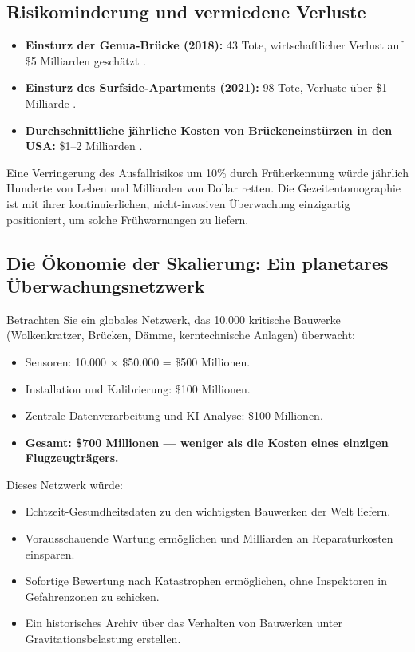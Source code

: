 \documentclass[12pt,a4paper]{article}
\theoremstyle{remark}
\begin{document}
	\subsection{Risikominderung und vermiedene Verluste}
	
	\begin{itemize}
		\item \textbf{Einsturz der Genua-Brücke (2018):} 43 Tote, wirtschaftlicher Verlust auf \$5 Milliarden geschätzt \cite{Genoa2018}.
		\item \textbf{Einsturz des Surfside-Apartments (2021):} 98 Tote, Verluste über \$1 Milliarde \cite{Surfside2021}.
		\item \textbf{Durchschnittliche jährliche Kosten von Brückeneinstürzen in den USA:} \$1–2 Milliarden \cite{ASCE2021}.
	\end{itemize}
	
	Eine Verringerung des Ausfallrisikos um 10\% durch Früherkennung würde jährlich Hunderte von Leben und Milliarden von Dollar retten. Die Gezeitentomographie ist mit ihrer kontinuierlichen, nicht-invasiven Überwachung einzigartig positioniert, um solche Frühwarnungen zu liefern.
	
	\subsection{Die Ökonomie der Skalierung: Ein planetares Überwachungsnetzwerk}
	
	Betrachten Sie ein globales Netzwerk, das 10.000 kritische Bauwerke (Wolkenkratzer, Brücken, Dämme, kerntechnische Anlagen) überwacht:
	
	\begin{itemize}
		\item Sensoren: 10.000 × \$50.000 = \$500 Millionen.
		\item Installation und Kalibrierung: \$100 Millionen.
		\item Zentrale Datenverarbeitung und KI-Analyse: \$100 Millionen.
		\item \textbf{Gesamt: \$700 Millionen — weniger als die Kosten eines einzigen Flugzeugträgers.}
	\end{itemize}
	
	Dieses Netzwerk würde:
	\begin{itemize}
		\item Echtzeit-Gesundheitsdaten zu den wichtigsten Bauwerken der Welt liefern.
		\item Vorausschauende Wartung ermöglichen und Milliarden an Reparaturkosten einsparen.
		\item Sofortige Bewertung nach Katastrophen ermöglichen, ohne Inspektoren in Gefahrenzonen zu schicken.
		\item Ein historisches Archiv über das Verhalten von Bauwerken unter Gravitationsbelastung erstellen.
	\end{itemize}
	
\end{document}
